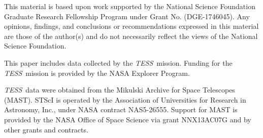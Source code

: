 \documentclass[twocolumn]{aastex63}
\newcommand{\tess}{{\it TESS}}
\begin{document}
This material is based upon work supported by the National Science Foundation Graduate Research Fellowship Program under Grant No. (DGE-1746045). Any opinions, findings, and conclusions or recommendations expressed in this material are those of the author(s) and do not necessarily reflect the views of the National Science Foundation.



This paper includes data collected by the \tess\ mission. Funding for the \tess\ mission is provided by the NASA Explorer Program.

\tess\ data were obtained from the Mikulski Archive for Space Telescopes
(MAST).
STScI is operated by the Association of Universities for Research in
Astronomy, Inc., under NASA contract NAS5-26555.
Support for MAST is provided by the NASA Office of Space Science via grant
NNX13AC07G and by other grants and contracts.














\end{document}
